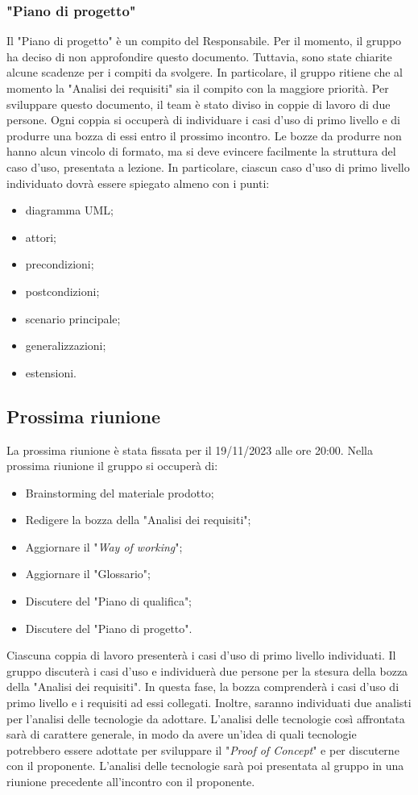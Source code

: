 \subsubsection{"Piano di progetto"}
Il "Piano di progetto" è un compito del Responsabile. Per il momento, il gruppo
ha deciso di non approfondire questo documento. Tuttavia, sono state chiarite
alcune scadenze per i compiti da svolgere. In particolare, il gruppo ritiene
che al momento la "Analisi dei requisiti" sia il compito con la maggiore priorità.
Per sviluppare questo documento, il team è stato diviso in coppie di lavoro di
due persone. Ogni coppia si occuperà di individuare i casi d'uso di primo
livello e di produrre una bozza di essi entro il prossimo incontro. Le bozze da
produrre non hanno alcun vincolo di formato, ma si deve evincere facilmente la
struttura del caso d'uso, presentata a lezione. In particolare, ciascun caso
d'uso di primo livello individuato dovrà essere spiegato almeno con i punti:
\begin{itemize}
	\item diagramma UML;
	\item attori;
	\item precondizioni;
	\item postcondizioni;
	\item scenario principale;
	\item generalizzazioni;
	\item estensioni.
\end{itemize}

\subsection{Prossima riunione}
La prossima riunione è stata fissata per il 19/11/2023 alle ore 20:00. Nella
prossima riunione il gruppo si occuperà di:
\begin{itemize}
	\item Brainstorming del materiale prodotto;
	\item Redigere la bozza della "Analisi dei requisiti";
	\item Aggiornare il "\textit{Way of working}";
	\item Aggiornare il "Glossario";
	\item Discutere del "Piano di qualifica";
	\item Discutere del "Piano di progetto".
\end{itemize}

Ciascuna coppia di lavoro presenterà i casi d'uso di primo livello individuati.
Il gruppo discuterà i casi d'uso e individuerà due persone per la stesura della
bozza della "Analisi dei requisiti". In questa fase, la bozza comprenderà i casi
d'uso di primo livello e i requisiti ad essi collegati. Inoltre,
saranno individuati due analisti per l'analisi delle tecnologie da adottare.
L'analisi delle tecnologie così affrontata sarà di carattere generale, in
modo da avere un'idea di quali tecnologie potrebbero essere adottate
per sviluppare il "\textit{Proof of Concept}" e per discuterne con il
proponente. L'analisi delle tecnologie sarà poi presentata al gruppo in
una riunione precedente all'incontro con il proponente.

